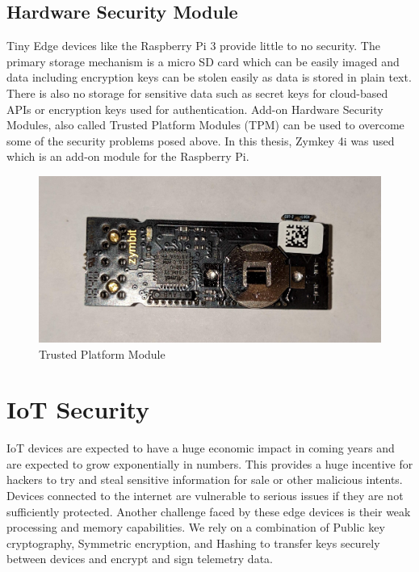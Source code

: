 \documentclass[11pt,openright]{report}
\begin{document}
\subsection{Hardware Security Module}
Tiny Edge devices like the Raspberry Pi 3 provide little to no security.
The primary storage mechanism is a micro SD card which can be easily imaged and data including encryption keys can be stolen easily as data is stored in plain text. There is also no storage for sensitive data such as secret keys for cloud-based APIs or encryption keys used for authentication. Add-on Hardware Security Modules, also called Trusted Platform Modules (TPM) can be used to overcome some of the security problems posed above. In this thesis, Zymkey 4i was used which is an add-on module for the Raspberry Pi.
\newline
\newline
\begin{figure}[!htbp]
    \centering
    \includegraphics[scale=0.1]{images/tpm.jpg}
    \caption{Trusted Platform Module}
    \label{fig:tpm}
\end{figure}
\newline
\newline
\section{IoT Security}
IoT devices are expected to have a huge economic impact in coming years and are expected to grow exponentially in numbers. This provides a huge incentive for hackers to try and steal sensitive information for sale or other malicious intents. Devices connected to the internet are vulnerable to serious issues if they are not sufficiently protected. Another challenge faced by these edge devices is their weak processing and memory capabilities. We rely on a combination of Public key cryptography, Symmetric encryption, and Hashing to transfer keys securely between devices and encrypt and sign telemetry data. 
\end{document}
